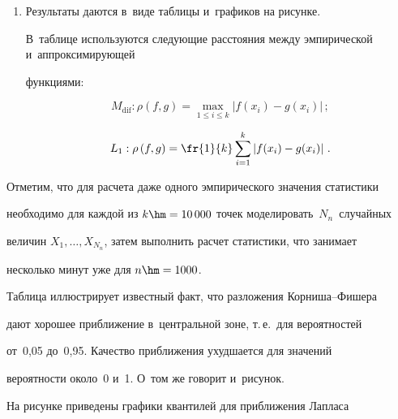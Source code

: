 \begin{multicols}{2}
\begin{enumerate}[1.]
    ап\-прок\-си\-ми\-ру\-ющей функции моделируется значение соответствующей квантили 

    распределения Стью\-ден\-та (Лапласа), значение самой функции рассчитыва\-ется 

    согласно полученным выражениям в~теоремах~1 и~2.

    \item   Результаты даются в~виде таблицы и~графиков на рисунке. 

    В~таблице используются следу\-ющие расстояния  между эмпирической и~аппроксимирующей 

    функциями:

    

    \noindent

            $$

        M_{\mathrm{dif}}: \rho\left(f,g\right)=\max\limits_{1\leq i\leq k}

        \left|f(x_i)-g(x_i)\right|\,; 

        $$

        $$

        L_{1}:  \rho\left(f,g\right)=

        \fr{1}{k}\sum\limits_{i=1}^k\left|f(x_i)-g(x_i)\right|\,.

        $$

\end{enumerate}





Отметим, что для расчета даже одного эмпирического значения статистики  

необходимо для каж\-дой из $k\hm=10\,000$ точек моделировать~$N_n$~случайных 

величин $X_1,\ldots, X_{N_n}$, затем выполнить расчет статистики, что занимает 

несколько минут уже для $n\hm=1000$.



Таблица  иллюстрирует известный факт, что разложения Кор\-ни\-ша--Фи\-ше\-ра

дают хорошее приближение в~центральной зоне, т.\,е.\ для вероятностей

от~0,05 до~0,95. Качество приближения ухудшается для значений

вероятности около~0 и~1. О~том же говорит и~рисунок.



На рисунке приведены графики квантилей для приближения Лапласа 


\end{multicols}
